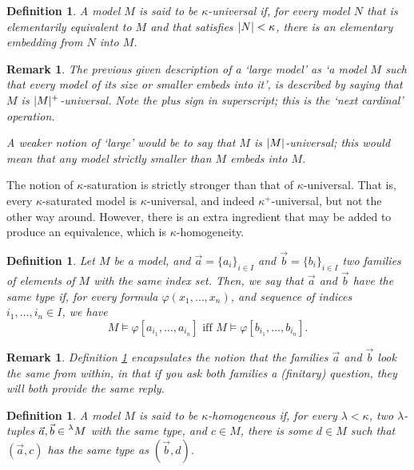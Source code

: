 \documentclass{article}
\newtheorem{remark}[theorem]{Remark}
\newtheorem{definition}[theorem]{Definition}
\theoremstyle{nonumberplain}
\DeclarePairedDelimiter{\card}{\lvert}{\rvert}
\begin{document}
\begin{definition}
A model $M$ is said to be \emph{$\kappa$-universal} if, for every model $N$ that is elementarily equivalent to $M$ and that satisfies $\card N < \kappa$, there is an elementary embedding from $N$ into $M$.
\end{definition}

\begin{remark}
The previous given description of a `large model' as `a model $M$ such that every model of its size or smaller embeds into it', is described by saying that $M$ is $\card{M}^+$-universal. Note the plus sign in superscript; this is the `next cardinal' operation.

A weaker notion of `large' would be to say that $M$ is $\card M$-universal; this would mean that any model \emph{strictly} smaller than $M$ embeds into $M$.
\end{remark}

The notion of $\kappa$-saturation is strictly stronger than that of $\kappa$-universal. That is, every $\kappa$-saturated model is $\kappa$-universal, and indeed $\kappa^+$-universal, but not the other way around. However, there is an extra ingredient that may be added to produce an equivalence, which is $\kappa$-homogeneity.

\begin{definition}\label{def:looksame}
Let $M$ be a model, and $\vec a = \{a_i\}_{i \in I}$ and $\vec b = \{b_i\}_{i \in I}$ two families of elements of $M$ with the same index set. Then, we say that $\vec a$ and $\vec b$ \emph{have the same type} if, for every formula $\varphi(x_1, \dots, x_n)$, and sequence of indices $i_1, \dots, i_n \in I$, we have
\begin{equation}
M \vDash \varphi[a_{i_1},\dots,a_{i_n}] \text{ iff } M \vDash \varphi[b_{i_1},\dots,b_{i_n}].
\end{equation}
\end{definition}

\begin{remark}\label{rmk:looksame}
Definition \ref{def:looksame} encapsulates the notion that the families $\vec a$ and $\vec b$ look the same from within, in that if you ask both families a (finitary) question, they will both provide the same reply.
\end{remark}

\begin{definition}\label{def:homogeneous}
A model $M$ is said to be $\kappa$-homogeneous if, for every $\lambda < \kappa$, two $\lambda$-tuples $\vec a, \vec b \in \prescript\lambda{}M$ with the same type, and $c \in M$, there is some $d \in M$ such that $(\vec a, c)$ has the same type as $(\vec b, d)$.
\end{definition}
\end{document}
